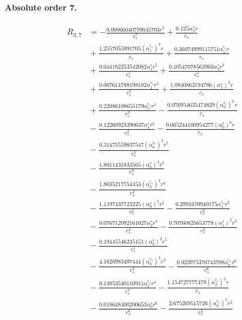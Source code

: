 \documentclass[10pt]{article}
\begin{document}
\paragraph{Absolute order 7.}
\begin{align*}
R_{3,7} &=  - \frac{0.00066040799045703 r^{7}}{c_{s}^{7}} + \frac{0.125 \alpha_{5}^s r}{c_{s}} \\
&{}  + \frac{1.2557055991705 \left(\alpha_{1}^{c_s}\right)^{3} r}{c_{s}} + \frac{0.36074999115751 \alpha_{5}^{c_s} r}{c_{s}} \\
&{}  + \frac{0.044182253542082 \alpha_{1}^s r^{5}}{c_{s}^{5}} + \frac{0.10547078563903 \alpha_{3}^s r^{3}}{c_{s}^{3}} \\
&{}  + \frac{0.067614788198182 \alpha_{1}^{c_s} r^{5}}{c_{s}^{5}} + \frac{1.0840862194786 \left(\alpha_{1}^s\right)^{3} r}{c_{s}} \\
&{}  + \frac{0.22086108655179 \alpha_{3}^{c_s} r^{3}}{c_{s}^{3}} - \frac{0.076954635474829 \left(\alpha_{0}^{c_s}\right)^{6} r}{c_{s}} \\
&{}  - \frac{0.12260923390637 \alpha_{4}^s r^{2}}{c_{s}^{2}} - \frac{0.065244100954277 \left(\alpha_{0}^s\right)^{6} r}{c_{s}} \\
&{}  - \frac{0.31475559837547 \left(\alpha_{0}^{c_s}\right)^{2} r^{5}}{c_{s}^{5}} \\
&{}  - \frac{1.8011431833565 \left(\alpha_{0}^s\right)^{4} r^{3}}{c_{s}^{3}} \\
&{}  - \frac{1.8035217754453 \left(\alpha_{0}^{c_s}\right)^{3} r^{4}}{c_{s}^{4}} \\
&{}  - \frac{1.1197437723225 \left(\alpha_{0}^s\right)^{5} r^{2}}{c_{s}^{2}} - \frac{0.2991670940175 \alpha_{4}^{c_s} r^{2}}{c_{s}^{2}} \\
&{}  - \frac{0.076712092161027 \alpha_{2}^s r^{4}}{c_{s}^{4}} - \frac{0.70760825653778 \left(\alpha_{1}^s\right)^{2} r^{3}}{c_{s}^{3}} \\
&{}  - \frac{0.19445546235151 \left(\alpha_{0}^s\right)^{2} r^{5}}{c_{s}^{5}} \\
&{}  - \frac{4.1620983497444 \left(\alpha_{0}^{c_s}\right)^{4} r^{3}}{c_{s}^{3}} - \frac{0.023975376743708 \alpha_{0}^{c_s} r^{6}}{c_{s}^{6}} \\
&{}  - \frac{0.13853540110911 \alpha_{2}^{c_s} r^{4}}{c_{s}^{4}} - \frac{1.154727777479 \left(\alpha_{2}^{c_s}\right)^{2} r}{c_{s}} \\
&{}  - \frac{0.018648400200653 \alpha_{0}^s r^{6}}{c_{s}^{6}} - \frac{2.675269515726 \left(\alpha_{0}^{c_s}\right)^{5} r^{2}}{c_{s}^{2}} \\

\end{align*}
\end{document}
